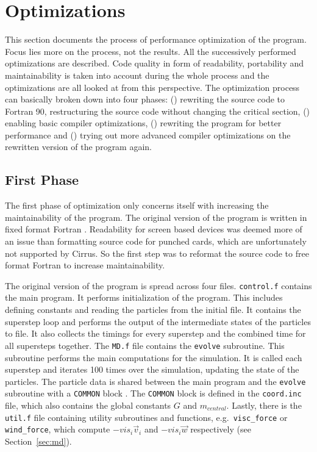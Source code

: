 \documentclass[twoside,11pt]{article}
\begin{document}

\section{Optimizations} %
\label{sec:opt}

This section documents the process of performance optimization of the
program.
Focus lies more on the process, not the results.
All the successively performed optimizations are described.
Code quality in form of readability, portability and maintainability
is taken into account during the whole process and the optimizations
are all looked at from this perspective.
The optimization process can basically broken down into four phases:
() rewriting the source code to Fortran 90,
restructuring the source code without changing the critical section,
() enabling basic compiler optimizations,
() rewriting the program for better performance and
() trying out more advanced compiler optimizations on
the rewritten version of the program again.

\subsection{First Phase} %

The first phase of optimization only concerns itself with increasing
the maintainability of the program.
The original version of the program is written in fixed format
Fortran \citep[see e.g.][for free vs.\ fixed format Fortran]
{fortran_free_fixed}.
Readability for screen based devices was deemed more of an issue than
formatting source code for punched cards, which are unfortunately not
supported by Cirrus.
So the first step was to reformat the source code to free format
Fortran to increase maintainability.

The original version of the program is spread across four files.
\texttt{control.f} contains the main program.
It performs initialization of the program.
This includes defining constants and reading the particles from the
initial file.
It contains the superstep loop and performs the output of the
intermediate states of the particles to file.
It also collects the timings for every superstep and the combined
time for all supersteps together.
The \texttt{MD.f} file contains the \texttt{evolve} subroutine.
This subroutine performs the main computations for the simulation.
It is called each superstep and iterates 100 times over the
simulation, updating the state of the particles.
The particle data is shared between the main program and the
\texttt{evolve} subroutine with a \texttt{COMMON} block
\citep[see e.g.][]{fortran_common}.
The \texttt{COMMON} block is defined in the \texttt{coord.inc} file,
which also contains the global constants $G$ and $m_{central}$.
Lastly, there is the \texttt{util.f} file containing utility
subroutines and functions, e.g.\ \texttt{visc\_force} or
\texttt{wind\_force}, which compute $-vis_i\vec{v}_i$ and
$-vis_i\vec{w}$ respectively (see Section~\ref{sec:md}).
\end{document}
